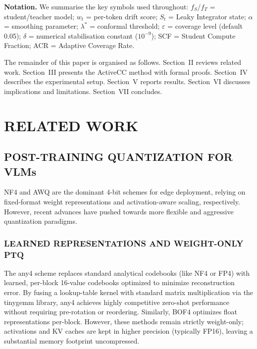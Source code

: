 \documentclass{ieeetmlcn}
\begin{document}
\noindent\textbf{Notation.} We summarise the key symbols used
throughout: $f_S$/$f_T$ = student/teacher model;
$w_t$ = per-token drift score; $S_t$ = Leaky Integrator state;
$\alpha$ = smoothing parameter; $\lambda^*$ = conformal threshold;
$\varepsilon$ = coverage level (default 0.05);
$\delta$ = numerical stabilisation constant ($10^{-9}$);
SCF = Student Compute Fraction; ACR = Adaptive Coverage Rate.

The remainder of this paper is organised as follows. Section~II reviews
related work. Section~III presents the ActiveCC method with formal
proofs. Section~IV describes the experimental setup. Section~V reports
results. Section~VI discusses implications and limitations.
Section~VII concludes.


\section{RELATED WORK}

\subsection{POST-TRAINING QUANTIZATION FOR VLMs}
NF4 \cite{dettmers2023qlora} and AWQ \cite{lin2024awq} are the dominant
4-bit schemes for edge deployment, relying on fixed-format weight representations and activation-aware scaling, respectively. However, recent advances have pushed towards more flexible and aggressive quantization paradigms. 

\subsubsection{LEARNED REPRESENTATIONS AND WEIGHT-ONLY PTQ}
The any4 scheme \cite{elhoushi2025any} replaces standard analytical codebooks (like NF4 or FP4) with learned, per-block 16-value codebooks optimized to minimize reconstruction error. By fusing a lookup-table kernel with standard matrix multiplication via the tinygemm library, any4 achieves highly competitive zero-shot performance without requiring pre-rotation or reordering. Similarly, BOF4 \cite{blumenberg2025bof4} optimizes float representations per-block. However, these methods remain strictly weight-only; activations and KV caches are kept in higher precision (typically FP16), leaving a substantial memory footprint uncompressed.
\end{document}
